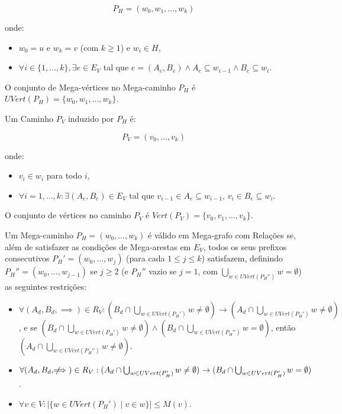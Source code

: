 \documentclass{article}
\begin{document}
\[ P_H = (w_0, w_1, \dots, w_k) \]

onde:

\begin{itemize}
    \item \( w_0 = u \) e \( w_k = v \) (com \( k \geq 1 \)) e \( w_i \in H \),
    \item \( \forall i \in \{1, \dots, k\}, \exists e \in E_V \) tal que \( e = (A_e, B_e) \wedge A_e \subseteq w_{i-1} \wedge B_e \subseteq w_i \).
\end{itemize}

O conjunto de Mega-vértices no Mega-caminho \( P_H \) é \( UVert(P_H) = \{ w_0, w_1, \dots, w_k \} \).

Um Caminho \( P_V \) induzido por \( P_H \) é:

\[ P_V = (v_0, \dots, v_k) \]

onde:

\begin{itemize}
    \item \( v_i \in w_i \) para todo \( i \),
    \item \( \forall i = 1, \dots, k: \exists (A_e, B_e) \in E_V \) tal que \( v_{i-1} \in A_e \subseteq w_{i-1} \), \( v_i \in B_e \subseteq w_i \).
\end{itemize}

O conjunto de vértices no caminho \( P_V \) é \( Vert(P_V) = \{ v_0, v_1, \dots, v_k \} \).
\newpage

Um Mega-caminho \( P_H = (w_0, \dots, w_k) \) é válido em Mega-grafo com Relações se, além de satisfazer as condições de Mega-arestas em \( E_V \), todos os seus prefixos consecutivos \( P_H' = (w_0, \dots, w_j) \) (para cada \( 1 \leq j \leq k \)) satisfazem, definindo \( P_H'' = (w_0, \dots, w_{j-1}) \) se \( j \geq 2 \) (e \( P_H'' \) vazio se \( j = 1 \), com \( \bigcup_{w \in UVert(P_H'')} w = \emptyset \))  as seguintes restrições:

\begin{itemize}
    \item \( \forall (A_d, B_d, \implies) \in R_V: (B_d \cap \bigcup_{w \in UVert(P_H')} w \neq \emptyset) \to (A_d \cap \bigcup_{w \in UVert(P_H')} w \neq \emptyset) \), e se \( (B_d \cap \bigcup_{w \in UVert(P_H')} w \neq \emptyset) \wedge (B_d \cap \bigcup_{w \in UVert(P_H'')} w = \emptyset) \), então \( (A_d \cap \bigcup_{w \in UVert(P_H'')} w \neq \emptyset) \).
    \item \( \forall (A_d, B_d, \not\!\!\!\implies) \in R_V: (A_d \cap \bigcup_{w \in UVert(P_H')} w \neq \emptyset) \to (B_d \cap \bigcup_{w \in UVert(P_H')} w = \emptyset) \).
    \item \( \forall v \in V: |\{ w \in UVert(P_H') \mid v \in w \}| \leq M(v) \).
\end{itemize}
\end{document}
